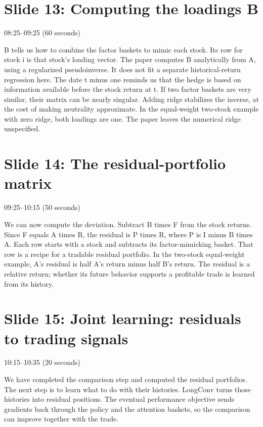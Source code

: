 \documentclass[11pt]{article}
\begin{document}
\section*{Slide 13: Computing the loadings B}

\textcolor{SBred}{08:25--09:25 (60 seconds)}

B tells us how to combine the factor baskets to mimic each stock. Its row for stock i is that stock's loading vector. The paper computes B analytically from A, using a regularized pseudoinverse. It does not fit a separate historical-return regression here. The date t minus one reminds us that the hedge is based on information available before the stock return at t. If two factor baskets are very similar, their matrix can be nearly singular. Adding ridge stabilizes the inverse, at the cost of making neutrality approximate. In the equal-weight two-stock example with zero ridge, both loadings are one. The paper leaves the numerical ridge unspecified.

\section*{Slide 14: The residual-portfolio matrix}

\textcolor{SBred}{09:25--10:15 (50 seconds)}

We can now compute the deviation. Subtract B times F from the stock returns. Since F equals A times R, the residual is P times R, where P is I minus B times A. Each row starts with a stock and subtracts its factor-mimicking basket. That row is a recipe for a tradable residual portfolio. In the two-stock equal-weight example, A's residual is half A's return minus half B's return. The residual is a relative return; whether its future behavior supports a profitable trade is learned from its history.

\section*{Slide 15: Joint learning: residuals to trading signals}

\textcolor{SBred}{10:15--10:35 (20 seconds)}

We have completed the comparison step and computed the residual portfolios. The next step is to learn what to do with their histories. LongConv turns those histories into residual positions. The eventual performance objective sends gradients back through the policy and the attention baskets, so the comparison can improve together with the trade.
\end{document}
